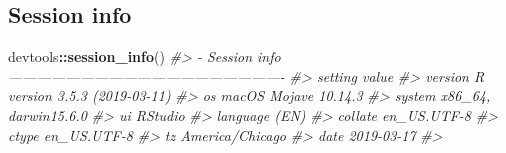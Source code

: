 \documentclass[oneside]{book}\usepackage[]{graphicx}\usepackage[]{color}
\newenvironment{Shaded}{\begin{snugshade}}{\end{snugshade}}
\newcommand{\CommentTok}[1]{\textcolor[rgb]{0.56,0.35,0.01}{\textit{#1}}}
\newcommand{\KeywordTok}[1]{\textcolor[rgb]{0.13,0.29,0.53}{\textbf{#1}}}
\newcommand{\NormalTok}[1]{#1}
\newcommand{\OperatorTok}[1]{\textcolor[rgb]{0.81,0.36,0.00}{\textbf{#1}}}
\begin{document}
\hypertarget{session-info}{%
\subsection{Session info}\label{session-info}}

\begin{Shaded}
\begin{Highlighting}[]


\NormalTok{devtools}\OperatorTok{::}\KeywordTok{session_info}\NormalTok{()}
\CommentTok{#> - Session info ----------------------------------------------------------}
\CommentTok{#>  setting  value                       }
\CommentTok{#>  version  R version 3.5.3 (2019-03-11)}
\CommentTok{#>  os       macOS Mojave 10.14.3        }
\CommentTok{#>  system   x86_64, darwin15.6.0        }
\CommentTok{#>  ui       RStudio                     }
\CommentTok{#>  language (EN)                        }
\CommentTok{#>  collate  en_US.UTF-8                 }
\CommentTok{#>  ctype    en_US.UTF-8                 }
\CommentTok{#>  tz       America/Chicago             }
\CommentTok{#>  date     2019-03-17                  }
\CommentTok{#> }

\end{Highlighting}
\end{Shaded}









\printbibliography
\end{document}
